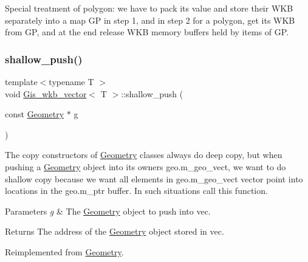 Special treatment of polygon\+: we have to pack its value and store their W\+KB separately into a map GP in step 1, and in step 2 for a polygon, get its W\+KB from GP, and at the end release W\+KB memory buffers held by items of GP. \mbox{\label{classGis__wkb__vector_a32edb92094841a33b5613cffe467cdcf}} 
\subsubsection{\texorpdfstring{shallow\+\_\+push()}{shallow\_push()}}
{\footnotesize\ttfamily template$<$typename T $>$ \\
void \mbox{\hyperlink{classGis__wkb__vector}{Gis\+\_\+wkb\+\_\+vector}}$<$ T $>$\+::shallow\+\_\+push (\begin{DoxyParamCaption}\item[{const \mbox{\hyperlink{classGeometry}{Geometry}} $\ast$}]{g }\end{DoxyParamCaption})\hspace{0.3cm}{\ttfamily [virtual]}}

The copy constructors of \mbox{\hyperlink{classGeometry}{Geometry}} classes always do deep copy, but when pushing a \mbox{\hyperlink{classGeometry}{Geometry}} object into its owner\textquotesingle{}s geo.\+m\+\_\+geo\+\_\+vect, we want to do shallow copy because we want all elements in geo.\+m\+\_\+geo\+\_\+vect vector point into locations in the geo.\+m\+\_\+ptr buffer. In such situations call this function. 
\begin{DoxyParams}{Parameters}
{\em g} & The \mbox{\hyperlink{classGeometry}{Geometry}} object to push into vec. \\
\hline
\end{DoxyParams}
\begin{DoxyReturn}{Returns}
The address of the \mbox{\hyperlink{classGeometry}{Geometry}} object stored in vec. 
\end{DoxyReturn}


Reimplemented from \mbox{\hyperlink{classGeometry}{Geometry}}.

\mbox{\label{classGis__wkb__vector_ab2674617e53e783614911ad5cfe890b7}} 
